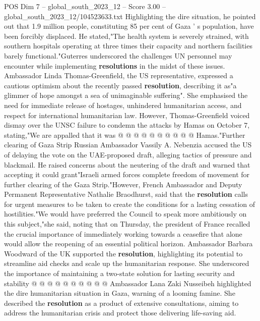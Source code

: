 \begin{textsample}{POS Dim 7 – global\_south\_2023\_12 – Score 3.00 – global\_south\_2023\_12/104523633.txt}
Highlighting the dire situation, he pointed out that 1.9 million people, constituting 85 per cent of Gaza ' s population, have been forcibly displaced.
He stated,"The health system is severely strained, with southern hospitals operating at three times their capacity and northern facilities barely functional."Guterres underscored the challenges UN personnel may encounter while implementing \textbf{resolutions} in the midst of these issues.
Ambassador Linda Thomas-Greenfield, the US representative, expressed a cautious optimism about the recently passed \textbf{resolution}, describing it as"a glimmer of hope amongst a sea of unimaginable suffering".
She emphasised the need for immediate release of hostages, unhindered humanitarian access, and respect for international humanitarian law.
However, Thomas-Greenfield voiced dismay over the UNSC failure to condemn the attacks by Hamas on October 7, stating,"We are appalled that it was @ @ @ @ @ @ @ @ @ @ Hamas."Further clearing of Gaza Strip Russian Ambassador Vassily A.
Nebenzia accused the US of delaying the vote on the UAE-proposed draft, alleging tactics of pressure and blackmail.
He raised concerns about the neutering of the draft and warned that accepting it could grant"Israeli armed forces complete freedom of movement for further clearing of the Gaza Strip."However, French Ambassador and Deputy Permanent Representative Nathalie Braodhurst, said that the \textbf{resolution} calls for urgent measures to be taken to create the conditions for a lasting cessation of hostilities."We would have preferred the Council to speak more ambitiously on this subject,"she said, noting that on Thursday, the president of France recalled the crucial importance of immediately working towards a ceasefire that alone would allow the reopening of an essential political horizon.
Ambassador Barbara Woodward of the UK supported the \textbf{resolution}, highlighting its potential to streamline aid checks and scale up the humanitarian response.
She underscored the importance of maintaining a two-state solution for lasting security and stability @ @ @ @ @ @ @ @ @ @ Ambassador Lana Zaki Nusseibeh highlighted the dire humanitarian situation in Gaza, warning of a looming famine.
She described the \textbf{resolution} as a product of extensive consultations, aiming to address the humanitarian crisis and protect those delivering life-saving aid.

\end{textsample}
